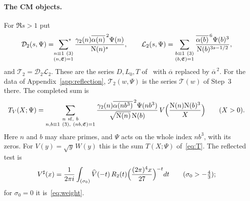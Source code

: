 \documentclass[11pt]{article}
\numberwithin{equation}{section}
\newcommand{\N}{\mathrm N}
\newcommand{\ssum}{\sideset{}{^*}\sum}
\begin{document}
\paragraph{The CM objects.} For $\Re s>1$ put
\begin{equation}\label{eq:d124}
 \mathcal D_2(s,\Psi)=\ssum_{\substack{n\equiv1\ (3)\\(n,\mathfrak E)=1}}
 \frac{\gamma_2(n)\overline{\alpha(n)}^{\,2}\Psi(n)}{\N(n)^s},\qquad
 \mathcal L_2(s,\Psi)=\sum_{\substack{b\equiv1\ (3)\\(b,\mathfrak E)=1}}
 \frac{\overline{\alpha(b)}^{\,6}\Psi(b)^3}{\N(b)^{3s-1/2}},
\end{equation}
and $\mathcal T_2=\mathcal D_2\mathcal L_2$. These are the series $D,L_0,T$ of~\cite[Proposition~5.1]{OAI78} with
$\overline\alpha$ replaced by $\overline\alpha^{\,2}$. For the data of Appendix~\ref{app:reflection},
$\mathcal T_2(w,\Psi)$ is the series $\mathcal T(w)$ of Step~3 there. The completed sum is
\begin{equation}\label{eq:d125}
 T_V(X;\Psi)=\sum_{\substack{n\ {\rm sf},\ b\\n,b\equiv1\ (3),\ (nb,\mathfrak E)=1}}
 \frac{\gamma_2(n)\overline{\alpha(nb^3)}^{\,2}\Psi(nb^3)}{\sqrt{\N(n)}\,\N(b)}
 \,V\Bigl(\frac{\N(n)\N(b)^3}X\Bigr)\qquad(X>0).
\end{equation}
Here $n$ and $b$ may share primes, and $\Psi$ acts on the whole index $nb^3$, with its zeros. For $V(y)=\sqrt
y\,W(y)$ this is the sum $T(X;\Psi)$ of~\eqref{eq:T}. The reflected test is
\begin{equation}\label{eq:d126}
 V^\sharp(x)=\frac1{2\pi i}\int_{(\sigma_0)}\widehat V(-t)\,R_2(t)\Bigl(\frac{(2\pi)^4x}{27}\Bigr)^{-t}dt
 \qquad(\sigma_0>-\tfrac43);
\end{equation}
for $\sigma_0=0$ it is~\eqref{eq:weight}.
\end{document}
